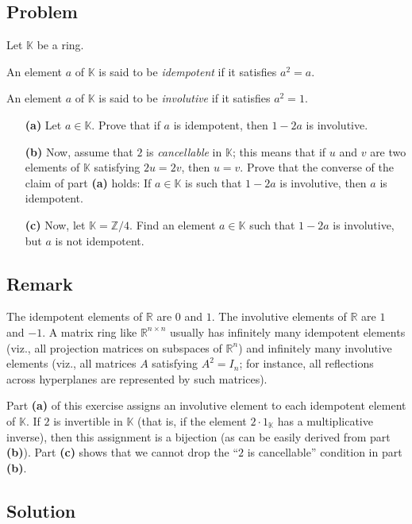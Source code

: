 \documentclass[paper=a4, fontsize=12pt]{scrartcl} %
\newcommand{\RR}{\mathbb{R}} %
\newcommand{\KK}{\mathbb{K}} %
\newcommand{\ZZ}{\mathbb{Z}} %
\theoremstyle{plainsl}
\theoremstyle{definition}
\theoremstyle{remark}
\begin{document}
\subsection{Problem}

Let $\KK$ be a ring.

An element $a$ of $\KK$ is said to be \textit{idempotent}
if it satisfies $a^2 = a$.

An element $a$ of $\KK$ is said to be \textit{involutive}
if it satisfies $a^2 = 1$.

\begin{enumerate}
 \item[\textbf{(a)}] Let $a \in \KK$.
 Prove that if $a$ is idempotent, then $1 - 2a$ is
 involutive.
 
 \item[\textbf{(b)}] Now, assume that $2$ is
 \textit{cancellable} in $\KK$; this means that if
 $u$ and $v$ are two elements of $\KK$ satisfying
 $2u = 2v$, then $u = v$.
 Prove that the converse of the claim of part
 \textbf{(a)} holds:
 If $a \in \KK$ is such that $1 - 2a$ is involutive,
 then $a$ is idempotent.
 
 \item[\textbf{(c)}] Now, let $\KK = \ZZ / 4$.
 Find an element $a \in \KK$ such that $1 - 2a$
 is involutive, but $a$ is not idempotent.
\end{enumerate}

\subsection{Remark}

The idempotent elements of $\RR$ are $0$ and $1$.
The involutive elements of $\RR$ are $1$ and $-1$.
A matrix ring like $\RR^{n \times n}$ usually has
infinitely many idempotent elements (viz., all
projection matrices on subspaces of $\RR^n$) and
infinitely many involutive elements (viz., all
matrices $A$ satisfying $A^2 = I_n$; for instance,
all reflections across hyperplanes are represented
by such matrices).

Part \textbf{(a)} of this exercise assigns an involutive
element to each idempotent element of $\KK$.
If $2$ is invertible in $\KK$ (that is, if the element
$2 \cdot 1_{\KK}$ has a multiplicative inverse), then this
assignment is a bijection (as can be easily derived from
part \textbf{(b)}).
Part \textbf{(c)} shows that we cannot drop the
``$2$ is cancellable'' condition in part \textbf{(b)}.

\subsection{Solution}
\end{document}
